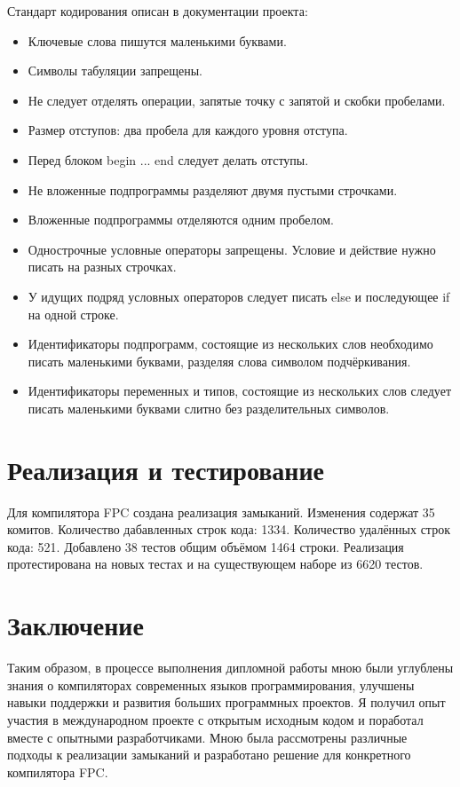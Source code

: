 \documentclass{imcs}
\begin{document}
Стандарт кодирования описан в документации проекта\cite{codingstyle}:
\begin{itemize}
  \item Ключевые слова пишутся маленькими буквами.
  \item Символы табуляции запрещены.
  \item Не следует отделять операции, запятые точку с запятой и скобки пробелами.
  \item Размер отступов: два пробела для каждого уровня отступа.
  \item Перед блоком begin ... end следует делать отступы.
  \item Не вложенные подпрограммы разделяют двумя пустыми строчками.
  \item Вложенные подпрограммы отделяются одним пробелом.
  \item Однострочные условные операторы запрещены. Условие и действие нужно писать на разных строчках.
  \item У идущих подряд условных операторов следует писать else и последующее if 
    на одной строке.
  \item Идентификаторы подпрограмм, состоящие из нескольких слов необходимо писать
    маленькими буквами, разделяя слова символом подчёркивания.
  \item Идентификаторы переменных и типов, состоящие из нескольких слов следует писать
    маленькими буквами слитно без разделительных символов.
\end{itemize}

\section{Реализация и тестирование}

Для компилятора FPC создана реализация замыканий. Изменения содержат 35 комитов. Количество
дабавленных строк кода: 1334. Количество удалённых строк кода: 521. Добавлено 38 тестов 
общим объёмом 1464 строки. Реализация протестирована на новых тестах и на существующем наборе из
6620 тестов.

\pagebreak

\section*{Заключение}

Таким образом, в процессе выполнения дипломной работы мною были углублены
знания о компиляторах современных языков программирования, улучшены навыки
поддержки и развития больших программных проектов. Я получил опыт участия в 
международном проекте с открытым исходным кодом и поработал вместе с опытными разработчиками.
Мною была рассмотрены различные подходы к реализации замыканий и разработано
решение для конкретного компилятора FPC.
\end{document}
